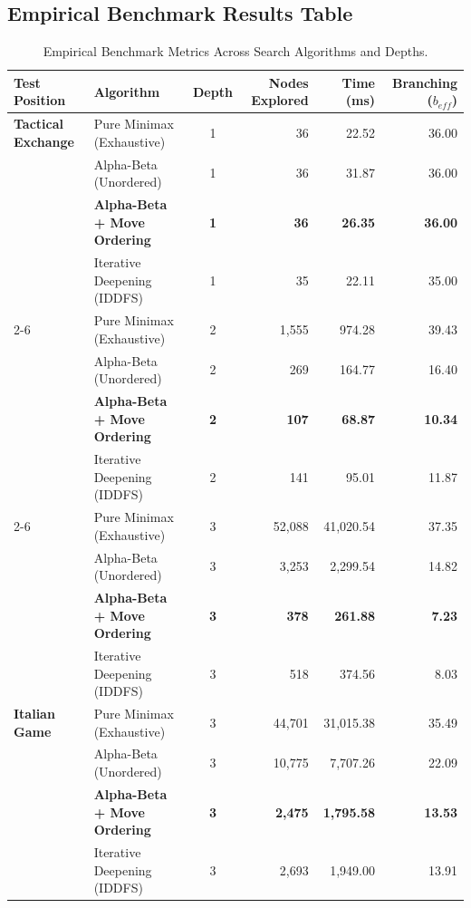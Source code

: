 \documentclass[11pt,a4paper]{article}
\begin{document}
\subsection{Empirical Benchmark Results Table}

\begin{table}[htbp]
\centering
\caption{Empirical Benchmark Metrics Across Search Algorithms and Depths.}
\label{tab:benchmark_results}
\small
\renewcommand{\arraystretch}{1.2}
\begin{tabularx}{\textwidth}{llcrrr}
\toprule
\textbf{Test Position} & \textbf{Algorithm} & \textbf{Depth} & \textbf{Nodes Explored} & \textbf{Time (ms)} & \textbf{Branching ($b_{eff}$)} \\
\midrule
\textbf{Tactical Exchange} & Pure Minimax (Exhaustive) & 1 & 36 & 22.52 & 36.00 \\
& Alpha-Beta (Unordered) & 1 & 36 & 31.87 & 36.00 \\
& \textbf{Alpha-Beta + Move Ordering} & \textbf{1} & \textbf{36} & \textbf{26.35} & \textbf{36.00} \\
& Iterative Deepening (IDDFS) & 1 & 35 & 22.11 & 35.00 \\
\cmidrule{2-6}
& Pure Minimax (Exhaustive) & 2 & 1,555 & 974.28 & 39.43 \\
& Alpha-Beta (Unordered) & 2 & 269 & 164.77 & 16.40 \\
& \textbf{Alpha-Beta + Move Ordering} & \textbf{2} & \textbf{107} & \textbf{68.87} & \textbf{10.34} \\
& Iterative Deepening (IDDFS) & 2 & 141 & 95.01 & 11.87 \\
\cmidrule{2-6}
& Pure Minimax (Exhaustive) & 3 & 52,088 & 41,020.54 & 37.35 \\
& Alpha-Beta (Unordered) & 3 & 3,253 & 2,299.54 & 14.82 \\
& \textbf{Alpha-Beta + Move Ordering} & \textbf{3} & \textbf{378} & \textbf{261.88} & \textbf{7.23} \\
& Iterative Deepening (IDDFS) & 3 & 518 & 374.56 & 8.03 \\
\midrule
\textbf{Italian Game} & Pure Minimax (Exhaustive) & 3 & 44,701 & 31,015.38 & 35.49 \\
& Alpha-Beta (Unordered) & 3 & 10,775 & 7,707.26 & 22.09 \\
& \textbf{Alpha-Beta + Move Ordering} & \textbf{3} & \textbf{2,475} & \textbf{1,795.58} & \textbf{13.53} \\
& Iterative Deepening (IDDFS) & 3 & 2,693 & 1,949.00 & 13.91 \\
\bottomrule
\end{tabularx}
\end{table}
\end{document}
